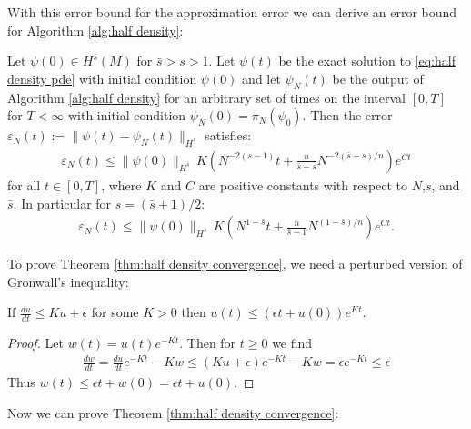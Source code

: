 \documentclass[final,leqno]{siamltex1213}
\begin{document}

With this error bound for the approximation error we can derive an error bound for Algorithm \ref{alg:half density}:

\begin{theorem} \label{thm:half density convergence}
	Let $\psi(0) \in H^{\bar{s}}(M)$ for $\bar{s} > s > 1$.
	Let $\psi(t)$ be the exact solution to \eqref{eq:half density pde} with initial condition $\psi(0)$ and let $\psi_{N}(t)$ be the output of Algorithm \ref{alg:half density} for an arbitrary set of times on the interval $[0,T]$ for $T < \infty$
	with initial condition $\psi_{N}(0) = \pi_{N}(\psi_{0})$.
	Then the error $\varepsilon_{N}(t) := \| \psi(t) - \psi_{N}(t) \|_{H^{s}}$ satisfies:
	\begin{align}
		\varepsilon_{N}(t) \leq \| \psi(0) \|_{H^{\bar{s}}} \, K \left( N^{-2(s-1)} t+  \frac{n}{\bar{s}-s} N^{-2(\bar{s}-s)/n} \right) e^{C t}
	\end{align}
	for all $t \in [0,T]$, where $K$ and $C$ are positive constants with respect to $N$,$s$, and $\bar{s}$.
	In particular for $s = (\bar{s}+1)/2$:
	\begin{align}
			\varepsilon_{N}(t) \leq \| \psi(0) \|_{H^{\bar{s}}} \, K \left( N^{1-\bar{s}} t+  \frac{n}{\bar{s}-1} N^{(1-\bar{s})/n} \right) e^{C t}.
	\end{align}
\end{theorem}

\noindent To prove Theorem \ref{thm:half density convergence}, we need a perturbed version of Gronwall's inequality:
\begin{lemma} \label{lem:Gronwall}
If $\frac{du}{dt} \leq Ku + \epsilon$ for some $K>0$ then $u(t) \leq (\epsilon t + u(0) ) e^{Kt}$.
\end{lemma}
\begin{proof}
	Let $w (t)= u (t) e^{-Kt}$.  Then for $t \geq 0$ we find
	\begin{align}
		\frac{dw}{dt} = \frac{du}{dt} e^{-Kt} - K w \leq (Ku+\epsilon) e^{-Kt} - Kw = \epsilon e^{-Kt} \leq \epsilon
	\end{align}
	Thus $w(t) \leq \epsilon t + w(0) = \epsilon t + u(0)$.
\end{proof}

Now we can prove Theorem \ref{thm:half density convergence}:
\end{document}
